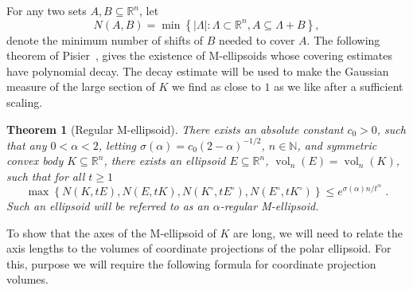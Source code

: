 \documentclass[11pt]{article}
\newtheorem{theorem}{Theorem}
\newcommand{\R}{{\mathbb{R}}}
\newcommand{\N}{{\mathbb{N}}}
\newcommand{\set}[1]{\left\{ #1 \right\}}
\DeclareMathOperator{\vol}{vol}
\begin{document}
For any two sets $A,B \subseteq \R^n$, let 
\[
N(A,B) = \min \set{|\Lambda|: \Lambda \subset \R^n, A \subseteq \Lambda+B} ,
\]
denote the minimum number of shifts of $B$ needed to cover $A$. The following
theorem of Pisier~\cite{Pisier-book}, gives the existence of M-ellipsoids whose
covering estimates have polynomial decay. The decay estimate will be used to
make the Gaussian measure of the large section of $K$ we find as close to $1$ as
we like after a sufficient scaling. 

\begin{theorem}[Regular M-ellipsoid]
\label{thm:reg-m}
There exists an absolute constant $c_0 > 0$, such that any $0 < \alpha < 2$,
letting $\sigma(\alpha) = c_0(2-\alpha)^{-1/2}$, $n \in \N$, and symmetric
convex body $K \subseteq \R^n$, there exists an ellipsoid $E \subseteq \R^n$,
$\vol_n(E)=\vol_n(K)$, such that for all $t \geq 1$
\[
\max \set{N(K,tE),N(E,tK),N(K^\circ,tE^\circ),N(E^\circ,tK^\circ)} \leq
e^{\sigma(\alpha) n / t^\alpha} \text{ .}
\]
Such an ellipsoid will be referred to as an $\alpha$-regular M-ellipsoid.
\end{theorem}


To show that the axes of the M-ellipsoid of $K$ are long, we will need to relate
the axis lengths to the volumes of coordinate projections of the polar
ellipsoid. For this, purpose we will require the following formula for
coordinate projection volumes. 
\end{document}
